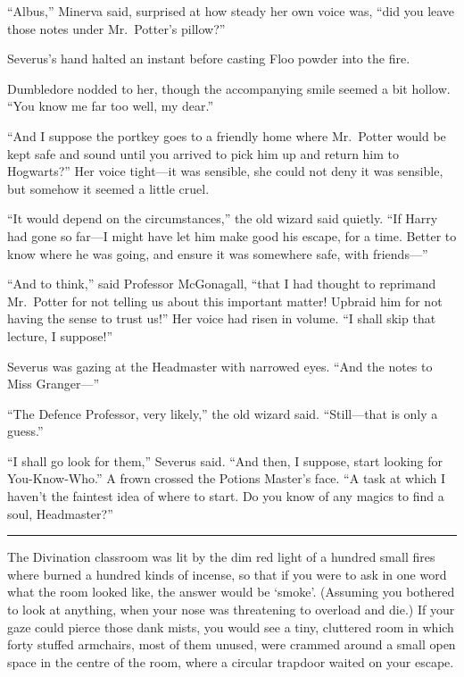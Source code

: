 ``Albus,'' Minerva said, surprised at how steady her own voice was,
``did you leave those notes under Mr.~Potter's pillow?''

Severus's hand halted an instant before casting Floo powder into the
fire.

Dumbledore nodded to her, though the accompanying smile seemed a bit
hollow. ``You know me far too well, my dear.''

``And I suppose the portkey goes to a friendly home where Mr.~Potter
would be kept safe and sound until you arrived to pick him up and return
him to Hogwarts?'' Her voice tight---it was sensible, she could not deny
it was sensible, but somehow it seemed a little cruel.

``It would depend on the circumstances,'' the old wizard said quietly.
``If Harry had gone so far---I might have let him make good his escape,
for a time. Better to know where he was going, and ensure it was
somewhere safe, with friends---''

``And to think,'' said Professor McGonagall, ``that I had thought to
reprimand Mr.~Potter for not telling us about this important matter!
Upbraid him for not having the sense to trust us!'' Her voice had risen
in volume. ``I shall skip that lecture, I suppose!''

Severus was gazing at the Headmaster with narrowed eyes. ``And the notes
to Miss Granger---''

``The Defence Professor, very likely,'' the old wizard said.
``Still---that is only a guess.''

``I shall go look for them,'' Severus said. ``And then, I suppose, start
looking for You-Know-Who.'' A frown crossed the Potions Master's face.
``A task at which I haven't the faintest idea of where to start. Do you
know of any magics to find a soul, Headmaster?''

\begin{center}\rule{3in}{0.4pt}\end{center}

The Divination classroom was lit by the dim red light of a hundred small
fires where burned a hundred kinds of incense, so that if you were to
ask in one word what the room looked like, the answer would be `smoke'.
(Assuming you bothered to look at anything, when your nose was
threatening to overload and die.) If your gaze could pierce those dank
mists, you would see a tiny, cluttered room in which forty stuffed
armchairs, most of them unused, were crammed around a small open space
in the centre of the room, where a circular trapdoor waited on your
escape.

